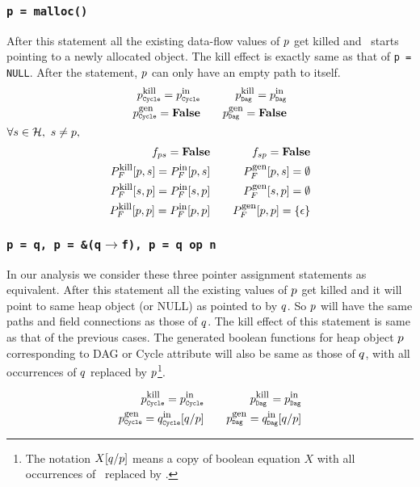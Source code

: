 \subsubsection {{\tt p = malloc()}}
After this statement all the existing data-flow values of $p$
get  killed and  \p\  starts pointing  to  a newly  allocated
object. The kill  effect is exactly same as that  of {\tt p =
  NULL}.  After the statement,  $p$ can  only have  an empty
path to itself.
\begin{eqnarray*}
  \KillC{p}  = \InC{p} &\quad& \KillD{p} = \InD{p} \\
  \GenC{p} = \false 	 &\quad& \GenD{p} = \false 
\end{eqnarray*}
$\forall \s \in \heap,\ \s \not= \p,$
\begin{eqnarray*}
  f_{ps} =\textbf{False}  &\quad& f_{sp} =\textbf{False} \\
  P_F^{\mbox{\footnotesize kill}}[p,s]  =  P_F^{\mbox{\footnotesize in}}[p,s] &\quad&
  P_F^{\mbox{\footnotesize gen}}[p,s]    =  \emptyset \\ 
  P_F^{\mbox{\footnotesize kill}}[s,p]  =  P_F^{\mbox{\footnotesize in}}[s,p] &\quad&
  P_F^{\mbox{\footnotesize gen}}[s,p]    =  \emptyset \\
  P_F^{\mbox{\footnotesize kill}}[p,p]  =  P_F^{\mbox{\footnotesize in}}[p,p] &\quad&
  P_F^{\mbox{\footnotesize gen}}[p,p]    =  \{\epsilon\}
\end{eqnarray*}


\subsubsection{\tt p = q, p = \&(q$\rightarrow$f), p = q op n} 
In our  analysis we  consider these three  pointer assignment
statements  as  equivalent.   After  this statement  all  the
existing values of $p$ get  killed and it will point to same
heap object  (or NULL)  as pointed to  by $q$. So  $p$ will
have the same  paths and field connections as  those of $q$.
The  kill effect of  this statement  is same  as that  of the
previous  cases.  The  generated boolean  functions  for heap
object $p$ corresponding to DAG or Cycle attribute will also
be  same as  those  of  $q$, with  all  occurrences of  $q$
replaced  by $p$\footnote{The  notation  $X[q/p]$ means  a
  copy  of  boolean  equation  $X$ with  all  occurrences  of
  \q\ replaced by \p.}.

\begin{eqnarray*}
  \KillC{p} = \InC{p} &\quad& \KillD{p} = \InD{p} \\ 
  \GenC{p}   = \InC{q}[q/p]
  &\quad& \GenD{p} = \InD{q}[q/p] 
\end{eqnarray*}


